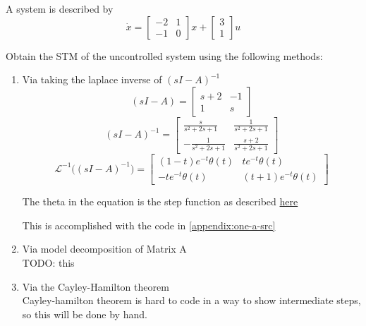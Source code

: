 \item A system is described by
  \begin{equation}
\dot x = \begin{bmatrix}
-2 & 1\\
-1 & 0
\end{bmatrix}
x + \begin{bmatrix}
3\\
1
\end{bmatrix}
u\end{equation}

  Obtain the STM of the uncontrolled system using the following methods:
  \begin{enumerate}
  \item Via taking the laplace inverse of $(sI - A)^{-1}$ \\
    \begin{equation}
(sI-A) = \left[\begin{matrix}s + 2 & -1\\1 & s\end{matrix}\right]\end{equation}
\begin{equation}
(sI-A)^{-1} = \left[\begin{matrix}\frac{s}{s^{2} + 2 s + 1} & \frac{1}{s^{2} + 2 s + 1}\\- \frac{1}{s^{2} + 2 s + 1} & \frac{s + 2}{s^{2} + 2 s + 1}\end{matrix}\right]\end{equation}
\begin{equation}
\mathscr{L}^{-1}\Big ((sI-A)^{-1}\Big ) = \left[\begin{matrix}\left(1 - t\right) e^{- t} \theta\left(t\right) & t e^{- t} \theta\left(t\right)\\- t e^{- t} \theta\left(t\right) & \left(t + 1\right) e^{- t} \theta\left(t\right)\end{matrix}\right]\end{equation}

    
    The theta in the equation is the step function as described
    \href{https://math.stackexchange.com/questions/1967109/inverse-laplace-transfrom-using-sympy}{here}
    
    This is accomplished with the code in \autoref{appendix:one-a-src}
  \item Via model decomposition of Matrix A \\
    {\LARGE \color{red} TODO: this}
  \item Via the Cayley-Hamilton theorem \\
    Cayley-hamilton theorem is hard to code in a way to show intermediate steps, so this will be done by
    hand.


\end{enumerate}

